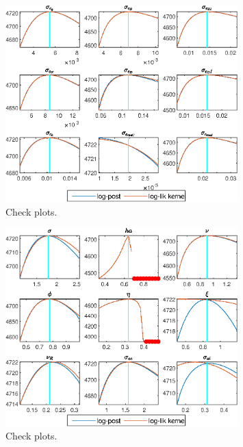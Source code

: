  
\begin{figure}[H]
\centering 
\includegraphics[width=0.80\textwidth]{BRS_sectoral_artificial_data/graphs/BRS_sectoral_artificial_data_CheckPlots1}
\caption{Check plots.}\label{Fig:CheckPlots:1}
\end{figure}
 
\begin{figure}[H]
\centering 
\includegraphics[width=0.80\textwidth]{BRS_sectoral_artificial_data/graphs/BRS_sectoral_artificial_data_CheckPlots2}
\caption{Check plots.}\label{Fig:CheckPlots:2}
\end{figure}
 
